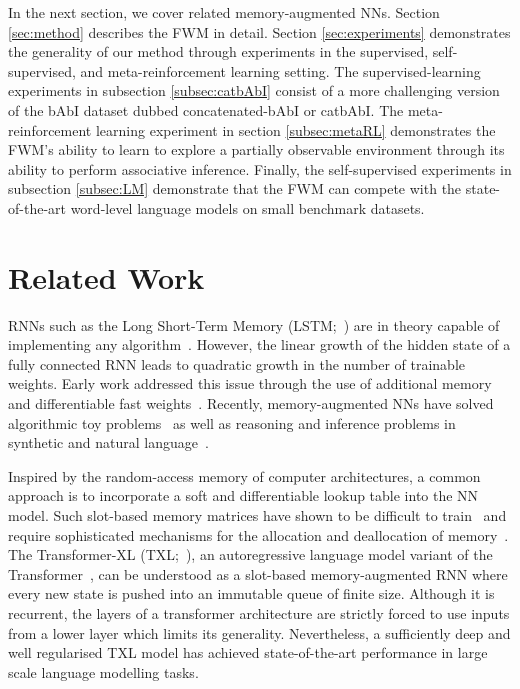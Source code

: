 \documentclass{article} \usepackage{iclr2021_conference,times}
\begin{document}
In the next section, we cover related memory-augmented NNs. Section \ref{sec:method} describes the FWM in detail. Section \ref{sec:experiments} demonstrates the generality of our method through experiments in the supervised, self-supervised, and meta-reinforcement learning setting. 
The supervised-learning experiments in subsection \ref{subsec:catbAbI} consist of a more challenging version of the bAbI dataset dubbed concatenated-bAbI or catbAbI. 
The meta-reinforcement learning experiment in section \ref{subsec:metaRL} demonstrates the FWM's ability to learn to explore a partially observable environment through its ability to perform associative inference.
Finally, the self-supervised experiments in subsection \ref{subsec:LM} demonstrate that the FWM can compete with the state-of-the-art word-level language models on small benchmark datasets.

\section{Related Work}
\label{sec:related-work}
RNNs such as the Long Short-Term Memory (LSTM;~\citet{lstm97and95,Gers:2000nc}) are in theory capable of implementing any algorithm~\citep{siegelmann91turing}.
However, the linear growth of the hidden state of a fully connected RNN leads to quadratic growth in the number of trainable weights.
Early work addressed this issue through the use of additional memory~\citep{Das:92,mozer1993connectionist} and differentiable fast weights~\citep{Schmidhuber:92ncfastweights,Schmidhuber:93ratioicann}. 
Recently, memory-augmented NNs have solved algorithmic toy problems~\citep{graves2014neural, graves2016} as well as reasoning and inference problems in synthetic and natural language~\citep{weston2015memorynets, xiong2016dynamic}.

Inspired by the random-access memory of computer architectures, a common approach is to incorporate a soft and differentiable lookup table into the NN model.
Such slot-based memory matrices have shown to be difficult to train~\citep{munkhdalai2017neural} and require sophisticated mechanisms for the allocation and deallocation of memory~\citep{csordas2018improving}.
The Transformer-XL (TXL;~\citet{dai2019transformer}), an autoregressive language model variant of the Transformer~\citep{vaswani2017attention}, can be understood as a slot-based memory-augmented RNN where every new state is pushed into an immutable queue of finite size. 
Although it is recurrent, the layers of a transformer architecture are strictly forced to use inputs from a lower layer which limits its generality. Nevertheless, a sufficiently deep and well regularised TXL model has achieved state-of-the-art performance in large scale language modelling tasks.
\end{document}
